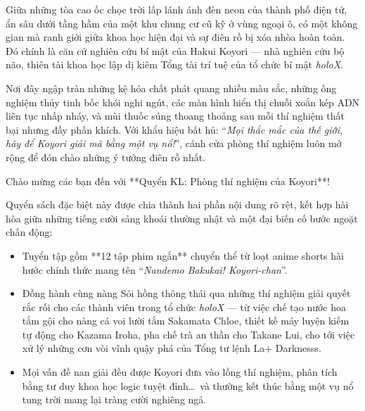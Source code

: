 \documentclass[main.tex]{subfiles}
\begin{document}
Giữa những tòa cao ốc chọc trời lấp lánh ánh đèn neon của thành phố điện tử, ẩn sâu dưới tầng hầm của một khu chung cư cũ kỹ ở vùng ngoại ô, có một không gian mà ranh giới giữa khoa học hiện đại và sự điên rồ bị xóa nhòa hoàn toàn. Đó chính là căn cứ nghiên cứu bí mật của Hakui Koyori — nhà nghiên cứu bộ não, thiên tài khoa học lập dị kiêm Tổng tài trí tuệ của tổ chức bí mật \textit{holoX}.

Nơi đây ngập tràn những kệ hóa chất phát quang nhiều màu sắc, những ống nghiệm thủy tinh bốc khói nghi ngút, các màn hình hiển thị chuỗi xoắn kép ADN liên tục nhấp nháy, và mùi thuốc súng thoang thoảng sau mỗi thí nghiệm thất bại nhưng đầy phấn khích. Với khẩu hiệu bất hủ: ``\textit{Mọi thắc mắc của thế giới, hãy để Koyori giải mã bằng một vụ nổ!}'', cánh cửa phòng thí nghiệm luôn mở rộng để đón chào những ý tưởng điên rồ nhất.

Chào mừng các bạn đến với **Quyển KL: Phòng thí nghiệm của Koyori**!

Quyển sách đặc biệt này được chia thành hai phần nội dung rõ rệt, kết hợp hài hòa giữa những tiếng cười sảng khoái thường nhật và một đại biến cố bước ngoặt chấn động:

{}
\begin{itemize}
  \item Tuyển tập gồm **12 tập phim ngắn** chuyển thể từ loạt anime shorts hài hước chính thức mang tên ``\textit{Nandemo Bakukai! Koyori-chan}''.
  \item Đồng hành cùng nàng Sói hồng thông thái qua những thí nghiệm giải quyết rắc rối cho các thành viên trong tổ chức \textit{holoX} — từ việc chế tạo nước hoa tắm gội cho nàng cá voi lười tắm Sakamata Chloe, thiết kế máy luyện kiếm tự động cho Kazama Iroha, pha chế trà an thần cho Takane Lui, cho tới việc xử lý những cơn vòi vĩnh quậy phá của Tổng tư lệnh La+ Darknesss.
  \item Mọi vấn đề nan giải đều được Koyori đưa vào lồng thí nghiệm, phân tích bằng tư duy khoa học logic tuyệt đỉnh\dots\ và thường kết thúc bằng một vụ nổ tung trời mang lại tràng cười nghiêng ngả.
\end{itemize}
\end{document}
